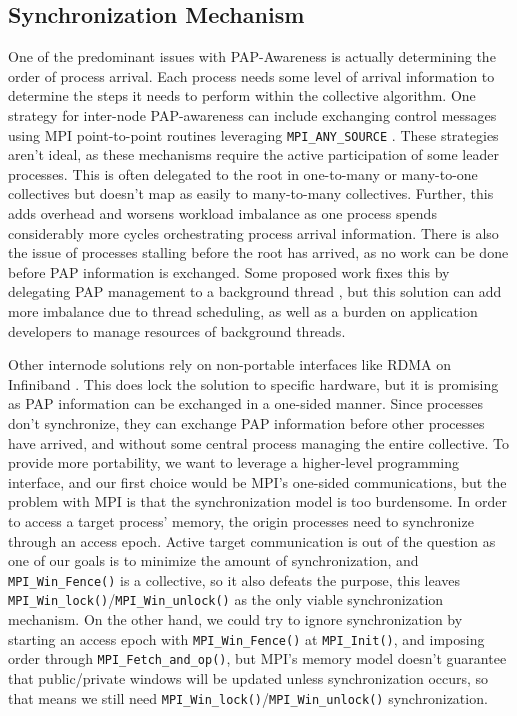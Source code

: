 \subsection{Synchronization Mechanism} %
One of the predominant issues with PAP-Awareness is actually determining the order of process arrival.
Each process needs some level of arrival information to determine the steps it needs to perform within the collective algorithm. 
One strategy for inter-node PAP-awareness can include exchanging control messages using MPI point-to-point routines leveraging \texttt{MPI\_ANY\_SOURCE} \cite{Patarasuk2008EffBcastDifProcArr}.
These strategies aren't ideal, as these mechanisms require the active participation of some leader processes.
This is often delegated to the root in one-to-many or many-to-one collectives but doesn't map as easily to many-to-many collectives.
Further, this adds overhead and worsens workload imbalance as one process spends considerably more cycles orchestrating process arrival information.
There is also the issue of processes stalling before the root has arrived, as no work can be done before PAP information is exchanged.
Some proposed work fixes this by delegating PAP management to a background thread \cite{Proficz2018ImprvAllReduceForImbPAP, Proficz2020PAPAwareScatterGather, Proficz2021AllGatherResilientToImbPAP, Faraj2008StudyProcArrivalMPIColl}, but this solution can add more imbalance due to thread scheduling, as well as a burden on application developers to manage resources of background threads.

Other internode solutions rely on non-portable interfaces like RDMA on Infiniband \cite{Qian2009ProcArrivalSHMA2AIB}.
This does lock the solution to specific hardware, but it is promising as PAP information can be exchanged in a one-sided manner.
Since processes don't synchronize, they can exchange PAP information before other processes have arrived, and without some central process managing the entire collective. 
To provide more portability, we want to leverage a higher-level programming interface, and our first choice would be MPI's one-sided communications, but the problem with MPI is that the synchronization model is too burdensome. 
In order to access a target process' memory, the origin processes need to synchronize through an access epoch. 
Active target communication is out of the question as one of our goals is to minimize the amount of synchronization, and \texttt{MPI\_Win\_Fence()} is a collective, so it also defeats the purpose, this leaves  \texttt{MPI\_Win\_lock()}/\texttt{MPI\_Win\_unlock()} as the only viable synchronization mechanism.
On the other hand, we could try to ignore synchronization by starting an access epoch with \texttt{MPI\_Win\_Fence()} at \texttt{MPI\_Init()}, and imposing order through \texttt{MPI\_Fetch\_and\_op()}, but MPI's memory model doesn't guarantee that public/private windows will be updated unless synchronization occurs, so that means we still need \texttt{MPI\_Win\_lock()}/\texttt{MPI\_Win\_unlock()}  synchronization.

